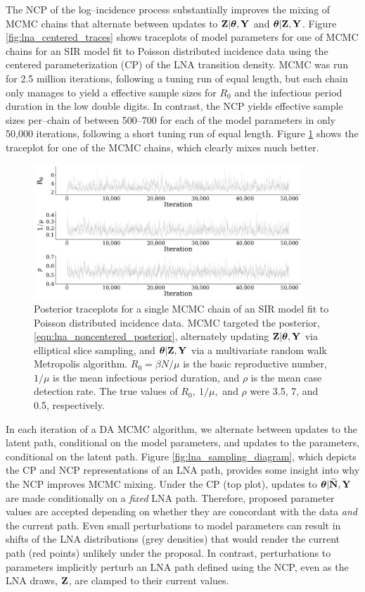 The NCP of the log--incidence process substantially improves the mixing of MCMC chains that alternate between updates to $ \mathbf{Z}|\boldsymbol{\theta},\mathbf{Y} $ and $ \boldsymbol{\theta}|\mathbf{Z},\mathbf{Y} $. Figure \ref{fig:lna_centered_traces} shows traceplots of model parameters for one of MCMC chains for an SIR model fit to Poisson distributed incidence data using the centered parameterization (CP) of the LNA transition density. MCMC was run for 2.5 million iterations, following a tuning run of equal length, but each chain only manages to yield a effective sample sizes for $ R_0 $ and the infectious period duration in the low double digits. In contrast, the NCP yields effective sample sizes per--chain of between 500--700 for each of the model parameters in only 50,000 iterations, following a short tuning run of equal length. Figure \ref{fig:lna_noncentered_traces} shows the traceplot for one of the MCMC chains, which clearly mixes much better. 

\begin{figure}
	\centering
	\includegraphics[width=0.9\textwidth]{figures/lna_noncentered_traces}
	\caption{Posterior traceplots for a single MCMC chain of an SIR model fit to Poisson distributed incidence data. MCMC targeted the posterior, \ref{eqn:lna_noncentered_posterior}, alternately updating $ \mathbf{Z}|\boldsymbol{\theta},\mathbf{Y} $ via elliptical slice sampling, and $ \boldsymbol{\theta}|\mathbf{Z},\mathbf{Y} $ via a multivariate random walk Metropolis algorithm. $ R_0 = \beta N / \mu$ is the basic reproductive number, $ 1/\mu $ is the mean infectious period duration, and $ \rho $ is the mean case detection rate. The true values of $ R_0,\ 1/\mu,$ and $ \rho $ were 3.5, 7, and 0.5, respectively.}
	\label{fig:lna_noncentered_traces}
\end{figure}

In each iteration of a DA MCMC algorithm, we alternate between updates to the latent path, conditional on the model parameters, and updates to the parameters, conditional on the latent path. Figure \ref{fig:lna_sampling_diagram}, which depicts the CP and NCP representations of an LNA path, provides some insight into why the NCP improves MCMC mixing. Under the CP (top plot), updates to $ \boldsymbol{\theta}|\widetilde{\mathbf{N}},\mathbf{Y} $ are made conditionally on a \textit{fixed} LNA path. Therefore, proposed parameter values are accepted depending on whether they are concordant with the data \textit{and} the current path. Even small perturbations to model parameters can result in shifts of the LNA distributions (grey densities) that would render the current path (red points) unlikely under the proposal. In contrast, perturbations to parameters implicitly perturb an LNA path defined using the NCP, even as the LNA draws, $ \mathbf{Z} $, are clamped to their current values. 

